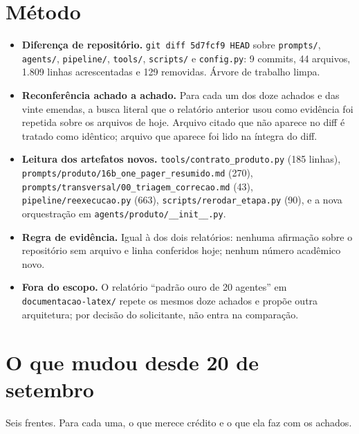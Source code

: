 \documentclass[11pt,a4paper]{article}
\begin{document}
\section{Método}

\begin{itemize}
  \item \textbf{Diferença de repositório.} \texttt{git diff 5d7fcf9 HEAD} sobre \texttt{prompts/},
        \texttt{agents/}, \texttt{pipeline/}, \texttt{tools/}, \texttt{scripts/} e \texttt{config.py}:
        9 commits, 44 arquivos, 1.809 linhas acrescentadas e 129 removidas. Árvore de trabalho limpa.
  \item \textbf{Reconferência achado a achado.} Para cada um dos doze achados e das vinte emendas, a
        busca literal que o relatório anterior usou como evidência foi repetida sobre os arquivos de
        hoje. Arquivo citado que não aparece no diff é tratado como idêntico; arquivo que aparece foi
        lido na íntegra do diff.
  \item \textbf{Leitura dos artefatos novos.} \texttt{tools/contrato\_produto.py} (185 linhas),
        \texttt{prompts/produto/16b\_one\_pager\_resumido.md} (270), \texttt{prompts/transversal/00\_triagem\_correcao.md}
        (43), \texttt{pipeline/reexecucao.py} (663), \texttt{scripts/rerodar\_etapa.py} (90), e a nova
        orquestração em \texttt{agents/produto/\_\_init\_\_.py}.
  \item \textbf{Regra de evidência.} Igual à dos dois relatórios: nenhuma afirmação sobre o
        repositório sem arquivo e linha conferidos hoje; nenhum número acadêmico novo.
  \item \textbf{Fora do escopo.} O relatório ``padrão ouro de 20 agentes'' em
        \texttt{documentacao-latex/} repete os mesmos doze achados e propõe outra arquitetura; por
        decisão do solicitante, não entra na comparação.
\end{itemize}

\section{O que mudou desde 20 de setembro}

Seis frentes. Para cada uma, o que merece crédito e o que ela faz com os achados.
\end{document}
